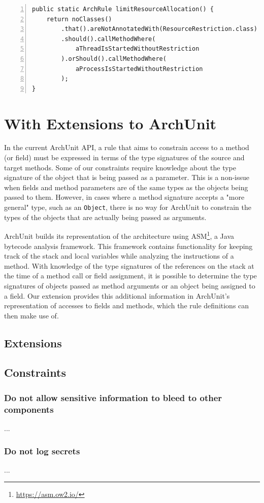 \begin{minipage}{\linewidth}
\begin{lstlisting}[caption={Rule definition for constraint 5.}, captionpos=b, label=lst:constraint_5_impl, numbers=left]
public static ArchRule limitResourceAllocation() {
    return noClasses()
        .that().areNotAnnotatedWith(ResourceRestriction.class)
        .should().callMethodWhere(
            aThreadIsStartedWithoutRestriction
        ).orShould().callMethodWhere(
            aProcessIsStartedWithoutRestriction
        );
}
\end{lstlisting}
\end{minipage}

\section{With Extensions to ArchUnit}

In the current ArchUnit API, a rule that aims to constrain access to a method (or field) must be expressed in terms of the type signatures of the source and target methods. Some of our constraints require knowledge about the type signature of the object that is being passed as a parameter. This is a non-issue when fields and method parameters are of the same types as the objects being passed to them. However, in cases where a method signature accepts a "more general" type, such as an \texttt{Object}, there is no way for ArchUnit to constrain the types of the objects that are actually being passed as arguments.

ArchUnit builds its representation of the architecture using ASM\footnote{\url{https://asm.ow2.io/}}, a Java bytecode analysis framework. This framework contains functionality for keeping track of the stack and local variables while analyzing the instructions of a method. With knowledge of the type signatures of the references on the stack at the time of a method call or field assignment, it is possible to determine the type signatures of objects passed as method arguments or an object being assigned to a field. Our extension provides this additional information in ArchUnit's representation of accesses to fields and methods, which the rule definitions can then make use of.


\subsection{Extensions}


\subsection{Constraints}


\subsubsection*{Do not allow sensitive information to bleed to other components}
...

\subsubsection*{Do not log secrets}
...
